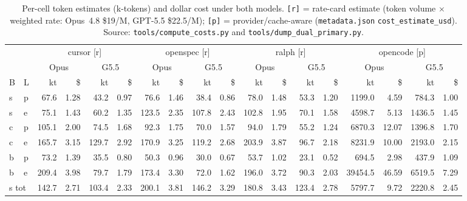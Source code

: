\begin{table}[h]
\centering
\caption{Per-cell token estimates (k-tokens) and dollar cost under
both models. \texttt{[r]} = rate-card estimate (token volume $\times$
weighted rate: Opus~4.8 \$19/M, GPT-5.5 \$22.5/M); \texttt{[p]} =
provider/cache-aware (\texttt{metadata.json} \texttt{cost\_estimate\_usd}).
Source: \texttt{tools/compute\_costs.py} and
\texttt{tools/dump\_dual\_primary.py}.}
\label{tab:cost}
\scriptsize
\setlength{\tabcolsep}{2pt}
\begin{tabular}{ll rr rr rr rr rr rr rr rr}
\toprule
 & & \multicolumn{4}{c}{cursor [r]} & \multicolumn{4}{c}{openspec [r]} & \multicolumn{4}{c}{ralph [r]} & \multicolumn{4}{c}{opencode [p]} \\
 \cmidrule(lr){3-6} \cmidrule(lr){7-10} \cmidrule(lr){11-14} \cmidrule(lr){15-18}
 & & \multicolumn{2}{c}{Opus} & \multicolumn{2}{c}{G5.5} & \multicolumn{2}{c}{Opus} & \multicolumn{2}{c}{G5.5} & \multicolumn{2}{c}{Opus} & \multicolumn{2}{c}{G5.5} & \multicolumn{2}{c}{Opus} & \multicolumn{2}{c}{G5.5} \\
 \cmidrule(lr){3-4} \cmidrule(lr){5-6} \cmidrule(lr){7-8} \cmidrule(lr){9-10} \cmidrule(lr){11-12} \cmidrule(lr){13-14} \cmidrule(lr){15-16} \cmidrule(lr){17-18}
B & L & kt & \$ & kt & \$ & kt & \$ & kt & \$ & kt & \$ & kt & \$ & kt & \$ & kt & \$ \\
\midrule
s & p & 67.6  & 1.28  & 43.2  & 0.97 & 76.6  & 1.46 & 38.4  & 0.86 & 78.0  & 1.48 & 53.3  & 1.20 & 1199.0 & 4.59 & 784.3 & 1.00 \\
s & e & 75.1  & 1.43  & 60.2  & 1.35 & 123.5 & 2.35 & 107.8 & 2.43 & 102.8 & 1.95 & 70.1  & 1.58 & 4598.7 & 5.13 & 1436.5 & 1.45 \\
\addlinespace
c & p & 105.1 & 2.00  & 74.5  & 1.68 & 92.3  & 1.75 & 70.0  & 1.57 & 94.0  & 1.79 & 55.2  & 1.24 & 6870.3 & 12.07 & 1396.8 & 1.70 \\
c & e & 165.7 & 3.15  & 129.7 & 2.92 & 170.9 & 3.25 & 119.2 & 2.68 & 203.9 & 3.87 & 96.7  & 2.18 & 8231.9 & 10.00 & 2193.0 & 2.15 \\
\addlinespace
b & p &  73.2 & 1.39  &  35.5 & 0.80 &  50.3 & 0.96 &  30.0 & 0.67 &  53.7 & 1.02 &  23.1 & 0.52 &  694.5 &  2.98 &  437.9 & 1.09 \\
b & e & 209.4 & 3.98  &  79.7 & 1.79 & 173.4 & 3.30 &  72.0 & 1.62 & 196.0 & 3.72 &  90.3 & 2.03 & 39454.5 & 46.59 & 6519.5 & 7.29 \\
\midrule
\multicolumn{2}{l}{s tot}    & 142.7 & 2.71  & 103.4 & 2.33 & 200.1 & 3.81 & 146.2 & 3.29 & 180.8 & 3.43 & 123.4 & 2.78 & 5797.7 & 9.72 & 2220.8 & 2.45 \\

\end{tabular}
\end{table}
